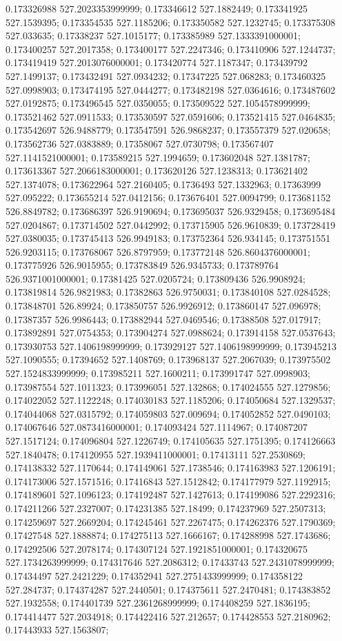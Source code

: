 0.173326988 527.2023353999999; 0.173346612 527.1882449; 0.173341925 527.1539395; 0.173354535 527.1185206; 0.173350582 527.1232745; 0.173375308 527.033635; 0.17338237 527.1015177; 0.173385989 527.1333391000001; 0.173400257 527.2017358; 0.173400177 527.2247346; 0.173410906 527.1244737; 0.173419419 527.2013076000001; 0.173420774 527.1187347; 0.173439792 527.1499137; 0.173432491 527.0934232; 0.17347225 527.068283; 0.173460325 527.0998903; 0.173474195 527.0444277; 0.173482198 527.0364616; 0.173487602 527.0192875; 0.173496545 527.0350055; 0.173509522 527.1054578999999; 0.173521462 527.0911533; 0.173530597 527.0591606; 0.173521415 527.0464835; 0.173542697 526.9488779; 0.173547591 526.9868237; 0.173557379 527.020658; 0.173562736 527.0383889; 0.17358067 527.0730798; 0.173567407 527.1141521000001; 0.173589215 527.1994659; 0.173602048 527.1381787; 0.173613367 527.2066183000001; 0.173620126 527.1238313; 0.173621402 527.1374078; 0.173622964 527.2160405; 0.1736493 527.1332963; 0.17363999 527.095222; 0.173655214 527.0412156; 0.173676401 527.0094799; 0.173681152 526.8849782; 0.173686397 526.9190694; 0.173695037 526.9329458; 0.173695484 527.0204867; 0.173714502 527.0442992; 0.173715905 526.9610839; 0.173728419 527.0380035; 0.173745413 526.9949183; 0.173752364 526.934145; 0.173751551 526.9203115; 0.173768067 526.8797959; 0.173772148 526.8604376000001; 0.173775926 526.9015955; 0.173783849 526.9345733; 0.173789764 526.9371001000001; 0.17381425 527.0205724; 0.173809436 526.9908924; 0.173819814 526.9821983; 0.17382863 526.9750031; 0.173840108 527.0284528; 0.173848701 526.89924; 0.173850757 526.9926912; 0.173860147 527.096978; 0.17387357 526.9986443; 0.173882944 527.0469546; 0.17388508 527.017917; 0.173892891 527.0754353; 0.173904274 527.0988624; 0.173914158 527.0537643; 0.173930753 527.1406198999999; 0.173929127 527.1406198999999; 0.173945213 527.1090555; 0.17394652 527.1408769; 0.173968137 527.2067039; 0.173975502 527.1524833999999; 0.173985211 527.1600211; 0.173991747 527.0998903; 0.173987554 527.1011323; 0.173996051 527.132868; 0.174024555 527.1279856; 0.174022052 527.1122248; 0.174030183 527.1185206; 0.174050684 527.1329537; 0.174044068 527.0315792; 0.174059803 527.009694; 0.174052852 527.0490103; 0.174067646 527.0873416000001; 0.174093424 527.1114967; 0.174087207 527.1517124; 0.174096804 527.1226749; 0.174105635 527.1751395; 0.174126663 527.1840478; 0.174120955 527.1939411000001; 0.17413111 527.2530869; 0.174138332 527.1170644; 0.174149061 527.1738546; 0.174163983 527.1206191; 0.174173006 527.1571516; 0.17416843 527.1512842; 0.174177979 527.1192915; 0.174189601 527.1096123; 0.174192487 527.1427613; 0.174199086 527.2292316; 0.174211266 527.2327007; 0.174231385 527.18499; 0.174237969 527.2507313; 0.174259697 527.2669204; 0.174245461 527.2267475; 0.174262376 527.1790369; 0.17427548 527.1888874; 0.174275113 527.1666167; 0.174288998 527.1743686; 0.174292506 527.2078174; 0.174307124 527.1921851000001; 0.174320675 527.1734263999999; 0.174317646 527.2086312; 0.17433743 527.2431078999999; 0.17434497 527.2421229; 0.174352941 527.2751433999999; 0.174358122 527.284737; 0.174374287 527.2440501; 0.174375611 527.2470481; 0.174383852 527.1932558; 0.174401739 527.2361268999999; 0.174408259 527.1836195; 0.174414477 527.2034918; 0.174422416 527.212657; 0.174428553 527.2180962; 0.17443933 527.1563807; 